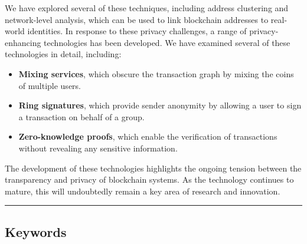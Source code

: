 We have explored several of these techniques, including address
clustering and network-level analysis, which can be used to link
blockchain addresses to real-world identities. In response to these
privacy challenges, a range of privacy-enhancing technologies has been
developed. We have examined several of these technologies in detail,
including:

\begin{itemize}
\tightlist
\item
  \textbf{Mixing services}, which obscure the transaction graph by
  mixing the coins of multiple users.
\item
  \textbf{Ring signatures}, which provide sender anonymity by allowing a
  user to sign a transaction on behalf of a group.
\item
  \textbf{Zero-knowledge proofs}, which enable the verification of
  transactions without revealing any sensitive information.
\end{itemize}

The development of these technologies highlights the ongoing tension
between the transparency and privacy of blockchain systems. As the
technology continues to mature, this will undoubtedly remain a key area
of research and innovation.

\begin{center}\rule{0.5\linewidth}{0.5pt}\end{center}

\subsection{Keywords}\label{keywords}

